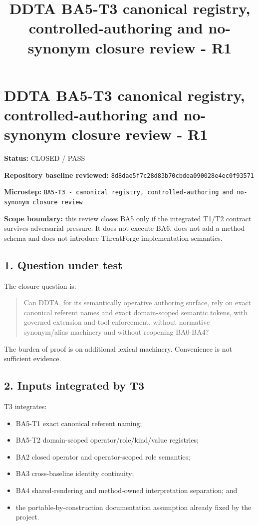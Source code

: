 \documentclass[
  10pt,
  a4paper,
]{article}
\title{DDTA BA5-T3 canonical registry, controlled-authoring and
no-synonym closure review - R1}
\author{}
\date{}
\providecommand{\tightlist}{%
  \setlength{\itemsep}{0pt}\setlength{\parskip}{0pt}}
\begin{document}
\maketitle

\section{DDTA BA5-T3 canonical registry, controlled-authoring and
no-synonym closure review -
R1}\label{ddta-ba5-t3-canonical-registry-controlled-authoring-and-no-synonym-closure-review---r1}

\textbf{Status:} CLOSED / PASS

\textbf{Repository baseline reviewed:}
\texttt{8d8dae5f7c28d83b70cbdea090028e4ec0f93571}

\textbf{Microstep:}
\texttt{BA5-T3\ -\ canonical\ registry,\ controlled-authoring\ and\ no-synonym\ closure\ review}

\textbf{Scope boundary:} this review closes BA5 only if the integrated
T1/T2 contract survives adversarial pressure. It does not execute BA6,
does not add a method schema and does not introduce ThreatForge
implementation semantics.

\subsection{1. Question under test}\label{1-question-under-test}

The closure question is:

\begin{quote}
Can DDTA, for its semantically operative authoring surface, rely on
exact canonical referent names and exact domain-scoped semantic tokens,
with governed extension and tool enforcement, without normative
synonym/alias machinery and without reopening BA0-BA4?
\end{quote}

The burden of proof is on additional lexical machinery. Convenience is
not sufficient evidence.

\subsection{2. Inputs integrated by T3}\label{2-inputs-integrated-by-t3}

T3 integrates:

\begin{itemize}
\tightlist
\item
  BA5-T1 exact canonical referent naming;
\item
  BA5-T2 domain-scoped operator/role/kind/value registries;
\item
  BA2 closed operator and operator-scoped role semantics;
\item
  BA3 cross-baseline identity continuity;
\item
  BA4 shared-rendering and method-owned interpretation separation; and
\item
  the portable-by-construction documentation assumption already fixed by
  the project.
\end{itemize}
\end{document}
